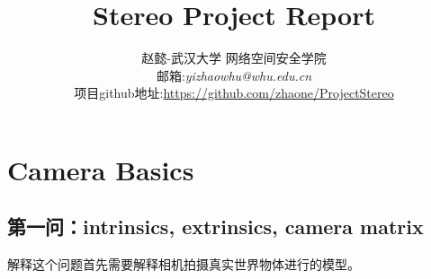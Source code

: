 \documentclass[UTF8]{ctexart}
\begin{document}
\title{Stereo Project Report}
\author{赵懿-武汉大学 网络空间安全学院\\
邮箱:\textit{yizhaowhu@whu.edu.cn}\\
项目github地址:\url{https://github.com/zhaone/ProjectStereo}}
\maketitle
\newpage
\tableofcontents
\newpage
\section{Camera Basics}
\subsection{第一问：intrinsics, extrinsics, camera matrix}
解释这个问题首先需要解释相机拍摄真实世界物体进行的模型。
\end{document}
